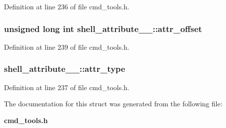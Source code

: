 Definition at line 236 of file cmd\_\-tools.h.
\subsubsection[{attr\_\-offset}]{\setlength{\rightskip}{0pt plus 5cm}unsigned long int {\bf shell\_\-attribute\_\-\_\-::attr\_\-offset}}\label{structshell__attribute_____4c8737502cb8a3036839f61402199d3d}




Definition at line 239 of file cmd\_\-tools.h.
\subsubsection[{attr\_\-type}]{ {\bf shell\_\-attribute\_\-\_\-::attr\_\-type}}\label{structshell__attribute_____12dbb5c64119c94cb7d50ed027233601}




Definition at line 237 of file cmd\_\-tools.h.

The documentation for this struct was generated from the following file:\begin{CompactItemize}
\item 
{\bf cmd\_\-tools.h}\end{CompactItemize}
